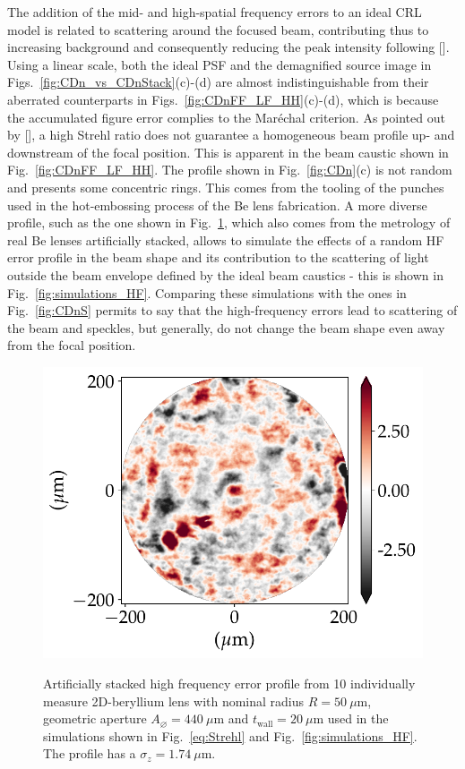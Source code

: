 \begin{refsection}
The addition of the mid- and high-spatial frequency errors to an ideal CRL model is related to scattering around the focused beam, contributing thus to increasing background and consequently reducing the peak intensity following [\cite{Harvey1995a}]. Using a linear scale, both the ideal PSF and the demagnified source image in Figs.~\ref{fig:CDn_vs_CDnStack}(c)-(d) are almost indistinguishable from their aberrated counterparts in Figs.~\ref{fig:CDnFF_LF_HH}(c)-(d), which is because the accumulated figure error complies to the Mar\'echal criterion. As pointed out by [\cite{Cocco2015, Cocco2019}], a high Strehl ratio does not guarantee a homogeneous beam profile up- and downstream of the focal position. This is apparent in the beam caustic shown in Fig.~\ref{fig:CDnFF_LF_HH}. The profile shown in Fig.~\ref{fig:CDn}(c) is not random and presents some concentric rings. This comes from the tooling of the punches used in the hot-embossing process of the Be lens fabrication. A more diverse profile, such as the one shown in Fig.~\ref{fig:CDnHF}, which also comes from the metrology of real Be lenses artificially stacked, allows to simulate the effects of a random HF error profile in the beam shape and its contribution to the scattering of light outside the beam envelope defined by the ideal beam caustics - this is shown in Fig.~\ref{fig:simulations_HF}. Comparing these simulations with the ones in Fig.~\ref{fig:CDnS} permits to say that the high-frequency errors lead to scattering of the beam and speckles, but generally, do not change the beam shape even away from the focal position.

\begin{figure}[t]
        \centering
        {\includegraphics[width=0.3\linewidth]{figures/ch05/CDnHF/phase_n_CRL_errors_residues_phase_figure_errors_FF}}
        \caption[High frequency errors profile]{Artificially stacked high frequency error profile from 10 individually measure 2D-beryllium lens with nominal radius $R=50~\mu\text{m}$, geometric aperture $A_{\diameter}=440~\mu\text{m}$ and $t_\text{wall}=20~\mu$m used in the simulations shown in Fig.~\ref{eq:Strehl} and Fig.~\ref{fig:simulations_HF}. The profile has a $\sigma_z=1.74~\mu$m.}\label{fig:CDnHF}
\end{figure}


\end{refsection}
